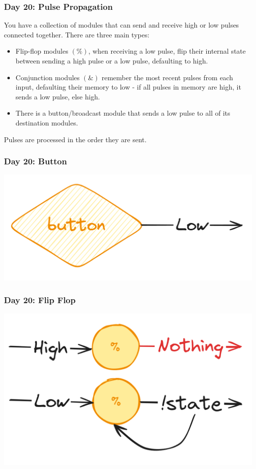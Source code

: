 \begin{frame}
\frametitle{Day 20: Pulse Propagation}

You have a collection of modules that can send and receive high or low pulses connected together. There are three main types:
\begin{itemize}
    \item Flip-flop modules $(\%)$, when receiving a low pulse, flip their internal state between sending a high pulse or a low pulse, defaulting to high.
    \item Conjunction modules $(\&)$ remember the most recent pulses from each input, defaulting their memory to low - if all pulses in memory are high, it sends a low pulse, else high.
    \item There is a button/broadcast module that sends a low pulse to all of its destination modules.
\end{itemize}\vfill

Pulses are processed in the order they are sent.

\end{frame}

\begin{frame}
\frametitle{Day 20: Button}

\includegraphics[width=\textwidth]{Day20Button}

\end{frame}

\begin{frame}
\frametitle{Day 20: Flip Flop}

\includegraphics[width=\textwidth]{Day20FlipFlop}

\end{frame}


